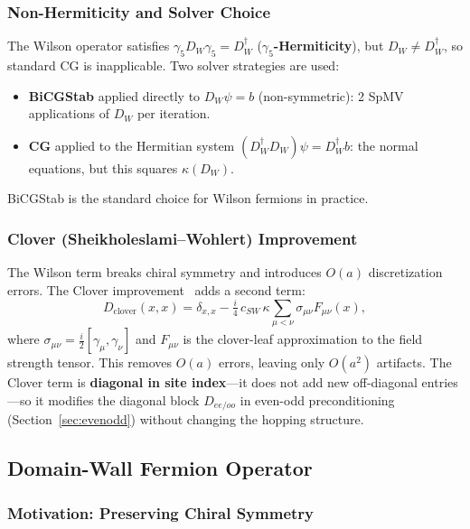 \documentclass[12pt,a4paper]{article}
\begin{document}
\subsubsection{Non-Hermiticity and Solver Choice}

The Wilson operator satisfies $\gamma_5 D_W \gamma_5 = D_W^\dagger$
(\textbf{$\gamma_5$-Hermiticity}), but $D_W \neq D_W^\dagger$, so
standard CG is inapplicable.
Two solver strategies are used:
\begin{itemize}
  \item \textbf{BiCGStab} applied directly to $D_W\psi = b$ (non-symmetric):
        2 SpMV applications of $D_W$ per iteration.
  \item \textbf{CG} applied to the Hermitian system $(D_W^\dagger D_W)\psi = D_W^\dagger b$:
        the normal equations, but this squares $\kappa(D_W)$.
\end{itemize}
BiCGStab is the standard choice for Wilson fermions in practice.

\subsubsection{Clover (Sheikholeslami--Wohlert) Improvement}

The Wilson term breaks chiral symmetry and introduces $O(a)$ discretization
errors.
The Clover improvement~\cite{Akahoshi2022} adds a second term:
\begin{equation}
  D_{\mathrm{clover}}(x,x) = \delta_{x,x} - \tfrac{i}{4}\,c_{SW}\,\kappa
    \sum_{\mu<\nu} \sigma_{\mu\nu} F_{\mu\nu}(x),
  \label{eq:clover}
\end{equation}
where $\sigma_{\mu\nu} = \tfrac{i}{2}[\gamma_\mu,\gamma_\nu]$ and $F_{\mu\nu}$
is the clover-leaf approximation to the field strength tensor.
This removes $O(a)$ errors, leaving only $O(a^2)$ artifacts.
The Clover term is \textbf{diagonal in site index}---it does not add new
off-diagonal entries---so it modifies the diagonal block $D_{ee/oo}$ in
even-odd preconditioning (Section~\ref{sec:evenodd}) without changing the
hopping structure.

\subsection{Domain-Wall Fermion Operator}
\label{sec:dwf}

\subsubsection{Motivation: Preserving Chiral Symmetry}
\end{document}
